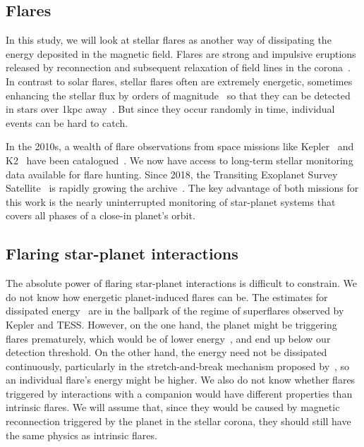\documentclass[twocolumn]{aastex631}
\begin{document}
\subsection{Flares}
\label{sec:intro:flares}
In this study, we will look at stellar flares as another way of dissipating the energy deposited in the magnetic field. Flares are strong and impulsive eruptions released by reconnection and subsequent relaxation of field lines in the corona~\citep{svestka1976solar,priest2002magnetic}. In contrast to solar flares, stellar flares often are extremely energetic, sometimes enhancing the stellar flux by orders of magnitude~\citep{maehara2012superflares, shibayama2013superflares, paudel2018k2} so that they can be detected in stars over 1kpc away~\citep{chang2015photometric}. But since they occur randomly in time, individual events can be hard to catch. %

In the 2010s, a wealth of flare observations from space missions like Kepler~\citep{borucki2010kepler} and K2~\citep{howell2014k2} have been catalogued~\citep{davenport2016kepler, paudel2018k2, ilin2021flares}. We now have access to long-term stellar monitoring data available for flare hunting. Since 2018, the Transiting Exoplanet Survey Satellite~\citep{ricker2015transiting} is rapidly growing the archive~\citep{gunther2020stellar}. The key advantage of both missions for this work is the nearly uninterrupted monitoring of star-planet systems that covers all phases of a close-in planet's orbit.

\subsection{Flaring star-planet interactions}
\label{sec:intro:fspi}
The absolute power of flaring star-planet interactions is difficult to constrain. We do not know how energetic planet-induced flares can be. The estimates for dissipated energy~\citep{lanza2018closeby} are in the ballpark of the regime of superflares observed by Kepler and TESS. However, on the one hand, the planet might be triggering flares prematurely, which would be of lower energy~\citep{loyd2023flares}, and end up below our detection threshold. On the other hand, the energy need not be dissipated continuously, particularly in the stretch-and-break mechanism proposed by~\citep{lanza2012starplanet}, so an individual flare's energy might be higher. We also do not know whether flares triggered by interactions with a companion would have different properties than intrinsic flares. We will assume that, since they would be caused by magnetic reconnection triggered by the planet in the stellar corona, they should still have the same physics as intrinsic flares. 
\end{document}
